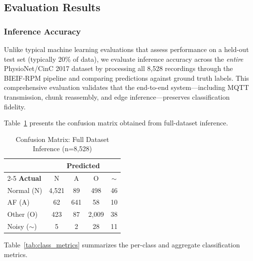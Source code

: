 \documentclass[10pt,twocolumn]{article}
\begin{document}
\subsection{Evaluation Results}
\label{subsec:results}

\subsubsection{Inference Accuracy}

Unlike typical machine learning evaluations that assess performance on a held-out test set (typically 20\% of data), we evaluate inference accuracy across the \textit{entire} PhysioNet/CinC 2017 dataset by processing all 8,528 recordings through the BIEIF-RPM pipeline and comparing predictions against ground truth labels. This comprehensive evaluation validates that the end-to-end system---including MQTT transmission, chunk reassembly, and edge inference---preserves classification fidelity.

Table~\ref{tab:confusion} presents the confusion matrix obtained from full-dataset inference.

\begin{table}[htbp]
\centering
\caption{Confusion Matrix: Full Dataset Inference (n=8,528)}
\label{tab:confusion}
\footnotesize
\begin{tabular}{@{}lcccc@{}}
\toprule
& \multicolumn{4}{c}{\textbf{Predicted}} \\
\cmidrule(l){2-5}
\textbf{Actual} & N & A & O & $\sim$ \\
\midrule
Normal (N) & 4,521 & 89 & 498 & 46 \\
AF (A) & 62 & 641 & 58 & 10 \\
Other (O) & 423 & 87 & 2,009 & 38 \\
Noisy ($\sim$) & 5 & 2 & 28 & 11 \\
\bottomrule
\end{tabular}
\end{table}

Table~\ref{tab:class_metrics} summarizes the per-class and aggregate classification metrics.
\end{document}
